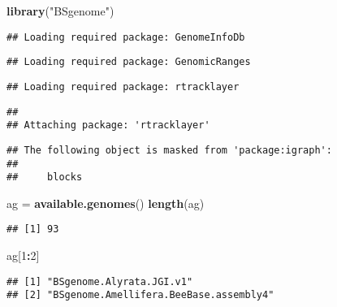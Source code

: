 \documentclass[]{article}
\newenvironment{Shaded}{\begin{snugshade}}{\end{snugshade}}
\newcommand{\KeywordTok}[1]{\textcolor[rgb]{0.13,0.29,0.53}{\textbf{#1}}}
\newcommand{\DecValTok}[1]{\textcolor[rgb]{0.00,0.00,0.81}{#1}}
\newcommand{\StringTok}[1]{\textcolor[rgb]{0.31,0.60,0.02}{#1}}
\newcommand{\OperatorTok}[1]{\textcolor[rgb]{0.81,0.36,0.00}{\textbf{#1}}}
\newcommand{\NormalTok}[1]{#1}
\begin{document}
\begin{Shaded}
\begin{Highlighting}[]
\KeywordTok{library}\NormalTok{(}\StringTok{"BSgenome"}\NormalTok{)}
\end{Highlighting}
\end{Shaded}

\begin{verbatim}
## Loading required package: GenomeInfoDb
\end{verbatim}

\begin{verbatim}
## Loading required package: GenomicRanges
\end{verbatim}

\begin{verbatim}
## Loading required package: rtracklayer
\end{verbatim}

\begin{verbatim}
## 
## Attaching package: 'rtracklayer'
\end{verbatim}

\begin{verbatim}
## The following object is masked from 'package:igraph':
## 
##     blocks
\end{verbatim}

\begin{Shaded}
\begin{Highlighting}[]
\NormalTok{ag =}\StringTok{ }\KeywordTok{available.genomes}\NormalTok{()}
\KeywordTok{length}\NormalTok{(ag)}
\end{Highlighting}
\end{Shaded}

\begin{verbatim}
## [1] 93
\end{verbatim}

\begin{Shaded}
\begin{Highlighting}[]
\NormalTok{ag[}\DecValTok{1}\OperatorTok{:}\DecValTok{2}\NormalTok{]}
\end{Highlighting}
\end{Shaded}

\begin{verbatim}
## [1] "BSgenome.Alyrata.JGI.v1"              
## [2] "BSgenome.Amellifera.BeeBase.assembly4"
\end{verbatim}

\begin{Shaded}
\end{Shaded}
\end{document}
